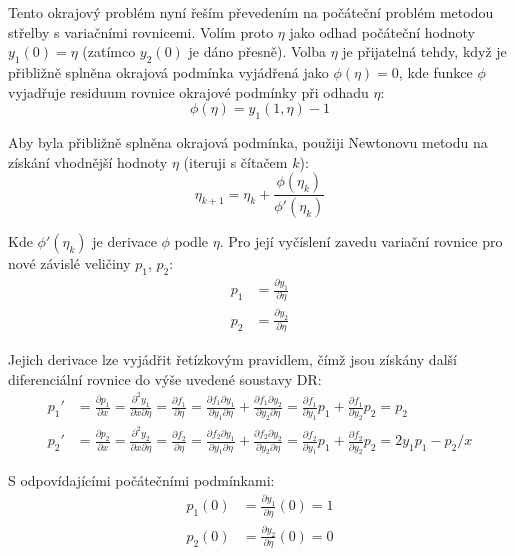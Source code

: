 \documentclass[a4paper,12pt]{article}
\begin{document}
Tento okrajový problém nyní řeším převedením na počáteční problém metodou střelby s variačními rovnicemi.
Volím proto $\eta$ jako odhad počáteční hodnoty $y_1(0) = \eta$ (zatímco $y_2(0)$ je dáno přesně).
Volba $\eta$ je přijatelná tehdy, když je přibližně splněna okrajová podmínka vyjádřená jako $\phi(\eta) = 0$, kde funkce $\phi$ vyjadřuje residuum rovnice okrajové podmínky při odhadu $\eta$:
\begin{equation}
	\phi(\eta) = y_1(1, \eta) - 1
\end{equation}

Aby byla přibližně splněna okrajová podmínka, použiji Newtonovu metodu na získání vhodnější hodnoty $\eta$ (iteruji s čítačem $k$):
\begin{equation}
	\eta_{k+1} = \eta_{k} + \frac{\phi(\eta_k)}{\phi'(\eta_k)}
\end{equation}

Kde $\phi'(\eta_k)$ je derivace $\phi$ podle $\eta$. Pro její vyčíslení zavedu variační rovnice pro nové závislé veličiny $p_1$, $p_2$:
\begin{align}
	p_1 &= \frac{\partial y_1}{\partial \eta}
	\\
	p_2 &= \frac{\partial y_2}{\partial \eta}
\end{align}

Jejich derivace lze vyjádřit řetízkovým pravidlem, čímž jsou získány další diferenciální rovnice do výše uvedené soustavy DR:
\begin{align}
	p_1' &=
	\frac{\partial p_1}{\partial x} =
	\frac{\partial^2 y_1}{\partial x \partial \eta} =
	\frac{\partial f_1}{\partial \eta} =
	\frac{\partial f_1 \partial y_1}{\partial y_1 \partial \eta} + \frac{\partial f_1 \partial y_2}{\partial y_2 \partial \eta} =
	\frac{\partial f_1}{\partial y_1} p_1 + \frac{\partial f_1}{\partial y_2} p_2 =
	p_2
	\\
	p_2' &=
	\frac{\partial p_2}{\partial x} =
	\frac{\partial^2 y_2}{\partial x \partial \eta} =
	\frac{\partial f_2}{\partial \eta} =
	\frac{\partial f_2 \partial y_1}{\partial y_1 \partial \eta} + \frac{\partial f_2 \partial y_2}{\partial y_2 \partial \eta} =
	\frac{\partial f_2}{\partial y_1} p_1 + \frac{\partial f_2}{\partial y_2} p_2 =
	2 y_1 p_1 - p_2 / x
\end{align}

S odpovídajícími počátečními podmínkami:
\begin{align}
	p_1(0) &= \frac{\partial y_1}{\partial \eta}(0) = 1
	\\
	p_2(0) &= \frac{\partial y_2}{\partial \eta}(0) = 0
\end{align}
\end{document}
